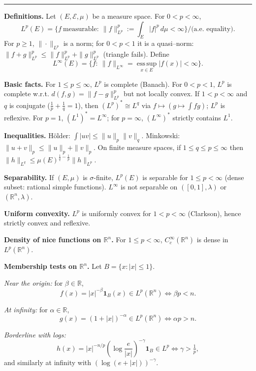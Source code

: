 \documentclass[12pt,a4paper]{article}
\theoremstyle{plain}
\theoremstyle{definition}
\theoremstyle{remark}
\theoremstyle{remark}
\newcommand{\tighthrule}{\vspace{0.6\baselineskip}\hrule\vspace{0.8\baselineskip}}
\newenvironment{spacy}{\begingroup\setlength{\parskip}{6pt}\setlength{\parindent}{0pt}}{\endgroup}
\theoremstyle{definition}
\begin{document}
\tighthrule
\begin{spacy}
	\textbf{Definitions.}
	Let $(E,\mathcal E,\mu)$ be a measure space. For $0<p<\infty$,
	\[
	L^p(E)=\{ f\ \text{measurable}:\ \|f\|_{L^p}^p:=\int_E |f|^p\,d\mu<\infty\}
	\big/ \text{(a.e.\ equality)}.
	\]
	For $p\ge 1$, $\|\cdot\|_{L^p}$ is a norm; for $0<p<1$ it is a quasi–norm:
	$\|f+g\|_{L^p}^p\le \|f\|_{L^p}^p+\|g\|_{L^p}^p$ (triangle fails).
	Define
	\[
	L^\infty(E)=\{ f:\ \|f\|_{L^\infty}=\operatorname*{ess\,sup}_{x\in E}|f(x)|<\infty\}.
	\]
	
	\textbf{Basic facts.}
	For $1\le p\le\infty$, $L^p$ is complete (Banach). For $0<p<1$, $L^p$ is complete w.r.t.
	$d(f,g)=\|f-g\|_{L^p}^p$ but not locally convex.
	If $1<p<\infty$ and $q$ is conjugate ($\tfrac1p+\tfrac1q=1$), then $(L^p)^*\cong L^q$ via
	$f\mapsto (g\mapsto \int fg)$; $L^p$ is reflexive. For $p=1$, $(L^1)^*=L^\infty$; for $p=\infty$,
	$(L^\infty)^*$ strictly contains $L^1$.
	
	\textbf{Inequalities.}
	Hölder: $\int |uv|\le \|u\|_p\|v\|_q$.
	Minkowski: $\|u+v\|_p\le \|u\|_p+\|v\|_p$.
	On finite measure spaces, if $1\le q\le p\le\infty$ then
	$\|h\|_{L^q}\le \mu(E)^{\frac1q-\frac1p}\|h\|_{L^p}$.
	
	\textbf{Separability.}
	If $(E,\mu)$ is $\sigma$-finite, $L^p(E)$ is separable for $1\le p<\infty$
	(dense subset: rational simple functions). $L^\infty$ is not separable on
	$([0,1],\lambda)$ or $(\mathbb R^n,\lambda)$.
	
	\textbf{Uniform convexity.}
	$L^p$ is uniformly convex for $1<p<\infty$ (Clarkson), hence strictly convex and reflexive.
	
	\textbf{Density of nice functions on $\mathbb R^n$.}
	For $1\le p<\infty$, $C_c^\infty(\mathbb R^n)$ is dense in $L^p(\mathbb R^n)$.
	
	\medskip
	\textbf{Membership tests on $\mathbb R^n$.}
	Let $B=\{x:|x|\le 1\}$.
	
	\emph{Near the origin:} for $\beta\in\mathbb R$,
	\[
	f(x)=|x|^{-\beta}\mathbf 1_{B}(x)\in L^p(\mathbb R^n)
	\iff \beta p < n.
	\]
	
	\emph{At infinity:} for $\alpha\in\mathbb R$,
	\[
	g(x)=(1+|x|)^{-\alpha}\in L^p(\mathbb R^n)
	\iff \alpha p > n.
	\]
	
	\emph{Borderline with logs:}
	\[
	h(x)=|x|^{-n/p}\!\left(\log\frac{e}{|x|}\right)^{-\gamma}\mathbf 1_{B}
	\in L^p \iff \gamma>\tfrac1p,
	\]
	and similarly at infinity with $\left(\log(e+|x|)\right)^{-\gamma}$.
	

\end{spacy}
\end{document}
